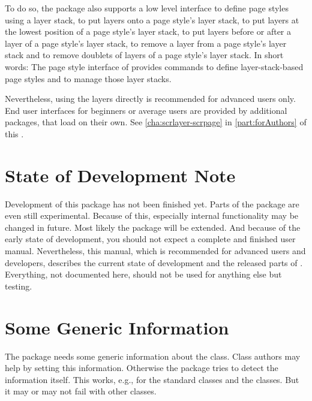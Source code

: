To do so, the package also supports a low level interface to define page
styles using a layer stack, to put layers onto a page style's layer stack, to
put layers at the lowest position of a page style's layer stack, to put layers
before or after a layer of a page style's layer stack, to remove a layer from
a page style's layer stack and to remove doublets of layers of a page style's
layer stack. In short words: The page style interface of 
provides commands to define layer-stack-based page styles and to manage those
layer stacks.

Nevertheless, using the layers directly is recommended for advanced users only.
End user interfaces for beginners or average users are provided by additional
packages, that load  on their own. See
\autoref{cha:scrlayer-scrpage} in \autoref{part:forAuthors} of this
.

\section{State of Development Note}

Development of this package has not been finished yet. Parts of the package
are even still experimental. Because of this, especially internal
functionality may be changed in future. Most likely the package will be
extended. And because of the early state of development, you should not expect
a complete and finished user manual. Nevertheless, this manual, which is
recommended for advanced users and developers, describes the current state of
development and the released parts of . Everything, not
documented here, should not be used for anything else but testing.


\section{Some Generic Information}

The package needs some generic information about the class. Class authors may
help  by setting this information. Otherwise the package tries
to detect the information itself. This works, e.g., for the standard classes
and the \KOMAScript{} classes. But it may or may not fail with other classes.

